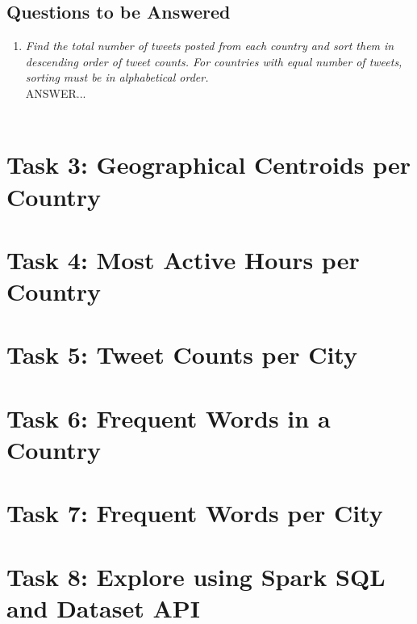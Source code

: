 \documentclass{article}
\begin{document}
\subsection*{Questions to be Answered}
\begin{enumerate}[label=\alph*)]
    \item \textit{Find the total number of tweets posted from each country and sort them in descending order of tweet counts. For countries with equal number of tweets, sorting must be in alphabetical order.}\\
    
    ANSWER...\\ \\
\end{enumerate}

\section*{Task 3: Geographical Centroids per Country}

\section*{Task 4: Most Active Hours per Country}

\section*{Task 5: Tweet Counts per City}

\section*{Task 6: Frequent Words in a Country}

\section*{Task 7: Frequent Words per City}

\section*{Task 8: Explore using Spark SQL and Dataset API}
\end{document}
